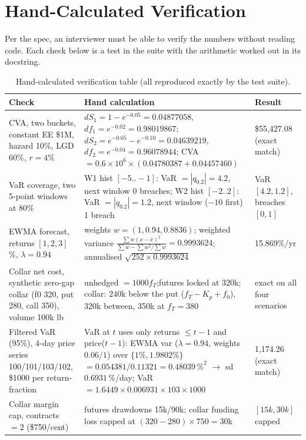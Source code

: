 \documentclass[11pt,a4paper]{article}
\newcommand{\usd}{\$}
\begin{document}
\section{Hand-Calculated Verification}\label{sec:handcalc}

Per the spec, an interviewer must be able to verify the numbers without
reading code. Each check below is a test in the suite with the arithmetic
worked out in its docstring.

\begin{table}[h!]
\centering\small
\begin{tabular}{p{4.2cm}p{7.6cm}p{3.4cm}}
\toprule
\textbf{Check} & \textbf{Hand calculation} & \textbf{Result} \\
\midrule
CVA, two buckets, constant EE \usd{}1M, hazard 10\%, LGD 60\%, $r=4$\% &
$dS_1 = 1-e^{-0.05} = 0.04877058$, $df_1 = e^{-0.02} = 0.98019867$;\newline
$dS_2 = e^{-0.05}-e^{-0.10} = 0.04639219$, $df_2 = e^{-0.04} = 0.96078944$;\newline
CVA $= 0.6 \times 10^6 \times (0.04780387 + 0.04457460)$ &
\usd{}55,427.08 (exact match) \\
\midrule
VaR coverage, two 5-point windows at 80\% &
W1 hist $[-5..-1]$: VaR $= |q_{0.2}| = 4.2$, next window 0 breaches;\newline
W2 hist $[-2..2]$: VaR $= |q_{0.2}| = 1.2$, next window ($-10$ first) 1 breach &
VaR $[4.2, 1.2]$, breaches $[0, 1]$ \\
\midrule
EWMA forecast, returns $[1,2,3]$\%, $\lambda = 0.94$ &
weights $w = (1, 0.94, 0.8836)$; weighted variance
$\frac{\sum w (x-\bar x)^2}{\sum w - \sum w^2 / \sum w} = 0.9993624$;
annualised $\sqrt{252 \times 0.9993624}$ &
15.869\%/yr \\
\midrule
Collar net cost, synthetic zero-gap collar (f0 320, put 280, call 350),
volume 100k lb &
unhedged $= 1000 f_T$;\newline futures locked at 320k;\newline
collar: $240$k below the put ($f_T - K_p + f_0$), 320k between, 350k at
$f_T = 380$ &
exact on all four scenarios \\
\midrule
Filtered VaR (95\%), 4-day price series 100/101/103/102,
\usd{}1000 per return-fraction &
VaR at $t$ uses only returns $\leq t{-}1$ and price($t{-}1$): EWMA var
($\lambda=0.94$, weights $0.06/1$) over $\{1\%, 1.9802\%\}$
$= 0.054381/0.11321 = 0.48039\,\%^2$ $\rightarrow$ sd $0.6931\,\%$/day;\newline
VaR $= 1.6449 \times 0.006931 \times 103 \times 1000$ &
1,174.26 (exact match) \\
\midrule
Collar margin cap, contracts $= 2$ (\usd{}750/cent) &
futures drawdowns 15k/90k; collar funding loss capped at
$(320-280)\times 750 = 30$k &
$[15k, 30k]$ capped \\
\bottomrule
\end{tabular}
\caption{Hand-calculated verification table (all reproduced exactly by the
test suite).}
\end{table}
\end{document}
